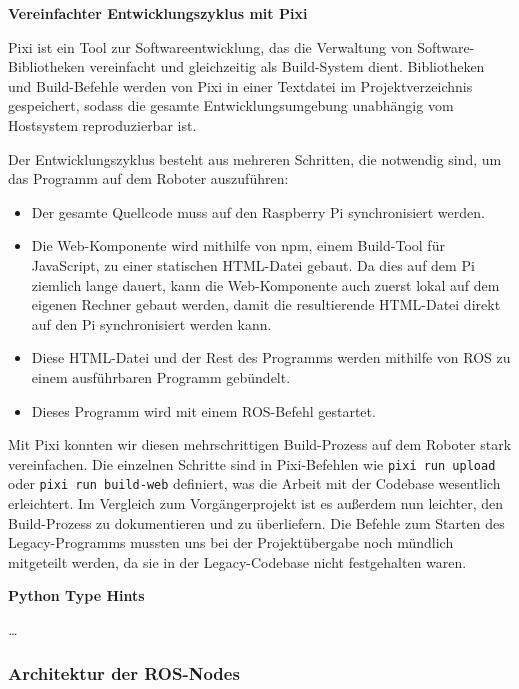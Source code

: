 \textbf{Vereinfachter Entwicklungszyklus mit Pixi}

Pixi ist ein Tool zur Softwareentwicklung, das die Verwaltung von Software-Bibliotheken vereinfacht und gleichzeitig als Build-System dient. Bibliotheken und Build-Befehle werden von Pixi in einer Textdatei im Projektverzeichnis gespeichert, sodass die gesamte Entwicklungsumgebung unabhängig vom Hostsystem reproduzierbar ist.

Der Entwicklungszyklus besteht aus mehreren Schritten, die notwendig sind, um das Programm auf dem Roboter auszuführen:
\begin{itemize}
	\item Der gesamte Quellcode muss auf den Raspberry Pi synchronisiert werden.
	\item Die Web-Komponente wird mithilfe von npm, einem Build-Tool für JavaScript, zu einer statischen HTML-Datei gebaut. Da dies auf dem Pi ziemlich lange dauert, kann die Web-Komponente auch zuerst lokal auf dem eigenen Rechner gebaut werden, damit die resultierende HTML-Datei direkt auf den Pi synchronisiert werden kann.
	\item Diese HTML-Datei und der Rest des Programms werden mithilfe von ROS zu einem ausführbaren Programm gebündelt.
	\item Dieses Programm wird mit einem ROS-Befehl gestartet.
\end{itemize}

Mit Pixi konnten wir diesen mehrschrittigen Build-Prozess auf dem Roboter stark vereinfachen. Die einzelnen Schritte sind in Pixi-Befehlen wie \texttt{pixi run upload} oder \texttt{pixi run build-web} definiert, was die Arbeit mit der Codebase wesentlich erleichtert. Im Vergleich zum Vorgängerprojekt ist es außerdem nun leichter, den Build-Prozess zu dokumentieren und zu überliefern. Die Befehle zum Starten des Legacy-Programms mussten uns bei der Projektübergabe noch mündlich mitgeteilt werden, da sie in der Legacy-Codebase nicht festgehalten waren. 

\textbf{Python Type Hints}

\textit{\dots}

\subsubsection{Architektur der ROS-Nodes}


